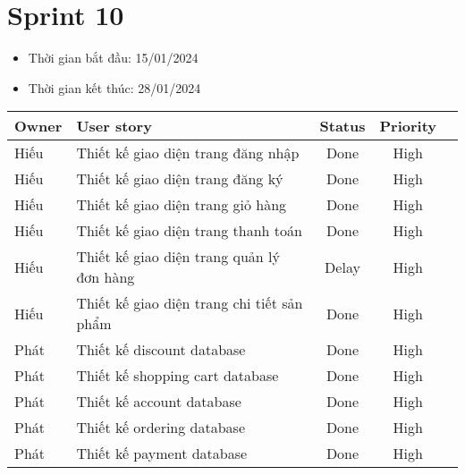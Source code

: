 \section{Sprint 10}
\begin{itemize}
    \item Thời gian bắt đầu: 15/01/2024
    \item Thời gian kết thúc: 28/01/2024
\end{itemize}
\begin{table}[H]
    \begin{tabular}{|m{2.5cm}|m{9cm}|c|c|c|}
    \hline
    \textbf{Owner}  & \textbf{User story}                                & \textbf{Status}  & \textbf{Priority} \\ \hline
    Hiếu               & Thiết kế giao diện trang đăng nhập                    & Done                              & High         \\ \hline
    Hiếu              & Thiết kế giao diện trang đăng ký                     & Done                              & High         \\ \hline
    Hiếu                & Thiết kế giao diện trang giỏ hàng                    & Done                              & High         \\ \hline
    Hiếu               & Thiết kế giao diện trang thanh toán                   & Done                              & High         \\ \hline
    Hiếu               & Thiết kế giao diện trang quản lý đơn hàng                    & Delay                              & High         \\ \hline
    Hiếu               & Thiết kế giao diện trang chi tiết sản phẩm                    & Done                              & High         \\ \hline
    Phát              & Thiết kế discount database                   & Done                              & High         \\ \hline
    Phát              & Thiết kế shopping cart database                    & Done                              & High         \\ \hline
    Phát              & Thiết kế account database                   & Done                              & High         \\ \hline
    Phát              & Thiết kế ordering database                    & Done                              & High         \\ \hline
    Phát              & Thiết kế payment database                    & Done                              & High         \\ \hline

\end{tabular}
\end{table}
